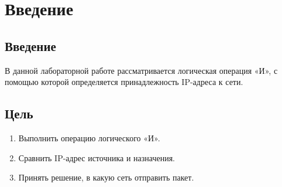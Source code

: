 \chapter{Введение}
\label{ch:intro}

\section{Введение}

В данной лабораторной работе рассматривается логическая операция «И», с помощью
которой определяется принадлежность IP-адреса к сети.

\section{Цель}  

\begin{enumerate}
    \item Выполнить операцию логического «И».
    \item Сравнить IP-адрес источника и назначения.
    \item Принять решение, в какую сеть отправить пакет.
\end{enumerate}

\endinput